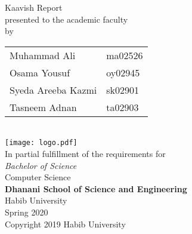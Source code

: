 \hypersetup{pageanchor=false}
\begin{titlepage}
  
  \begin{center}
    \vfill
    \textbf{\Huge \Title}
    \bigskip

    {\large Kaavish Report\\
      presented to the academic faculty\\
      by\\\bigskip
      \begin{tabular}{ll}
        Muhammad Ali & ma02526\\
        Osama Yousuf & oy02945\\
        Syeda Areeba Kazmi & sk02901\\
        Tasneem Adnan & ta02903\\
      \end{tabular}
    }\\\vfill
    \texttt{[image: logo.pdf]}\\
    {\large In partial fulfillment of the requirements for\\
      \textit{Bachelor of Science}\\
      Computer Science\\\medskip
      \textbf{Dhanani School of Science and Engineering}\\\medskip
      Habib University\\\smallskip
      Spring 2020
    }\\\vfill
    Copyright {\scriptsize \textcopyright} 2019 Habib University
  \end{center}
  \restoregeometry
\end{titlepage}
\hypersetup{pageanchor=true}
